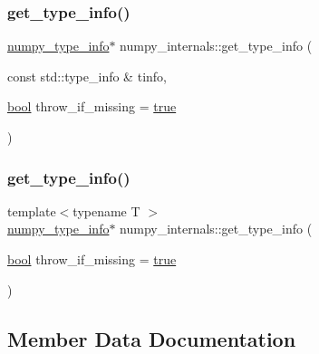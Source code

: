\subsubsection{\texorpdfstring{get\_type\_info()}{get\_type\_info()}\hspace{0.1cm}{\footnotesize\ttfamily [1/2]}}
{\footnotesize\ttfamily \mbox{\hyperlink{structnumpy__type__info}{numpy\+\_\+type\+\_\+info}}$\ast$ numpy\+\_\+internals\+::get\+\_\+type\+\_\+info (\begin{DoxyParamCaption}\item[{const std\+::type\+\_\+info \&}]{tinfo,  }\item[{\mbox{\hyperlink{asdl_8h_af6a258d8f3ee5206d682d799316314b1}{bool}}}]{throw\+\_\+if\+\_\+missing = {\ttfamily \mbox{\hyperlink{asdl_8h_af6a258d8f3ee5206d682d799316314b1a08f175a5505a10b9ed657defeb050e4b}{true}}} }\end{DoxyParamCaption})\hspace{0.3cm}{\ttfamily [inline]}}

\mbox{\label{structnumpy__internals_a1e1af655e678c583636e925057358549}} 
\subsubsection{\texorpdfstring{get\_type\_info()}{get\_type\_info()}\hspace{0.1cm}{\footnotesize\ttfamily [2/2]}}
{\footnotesize\ttfamily template$<$typename T $>$ \\
\mbox{\hyperlink{structnumpy__type__info}{numpy\+\_\+type\+\_\+info}}$\ast$ numpy\+\_\+internals\+::get\+\_\+type\+\_\+info (\begin{DoxyParamCaption}\item[{\mbox{\hyperlink{asdl_8h_af6a258d8f3ee5206d682d799316314b1}{bool}}}]{throw\+\_\+if\+\_\+missing = {\ttfamily \mbox{\hyperlink{asdl_8h_af6a258d8f3ee5206d682d799316314b1a08f175a5505a10b9ed657defeb050e4b}{true}}} }\end{DoxyParamCaption})\hspace{0.3cm}{\ttfamily [inline]}}



\subsection{Member Data Documentation}
\mbox{\label{structnumpy__internals_aa842b07421e15ccd48ea036955fc84f4}} 
